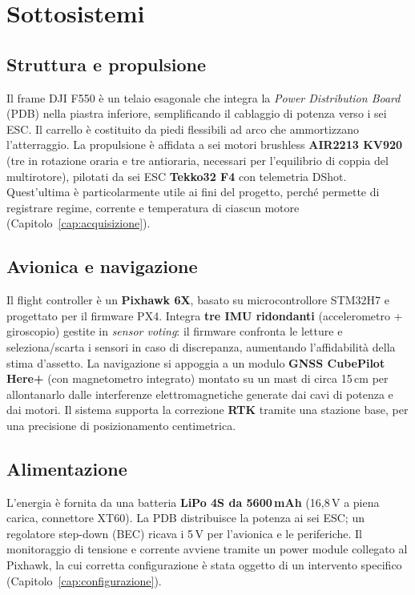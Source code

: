 \section{Sottosistemi}

\subsection{Struttura e propulsione}
Il frame DJI F550 \`e un telaio esagonale che integra la \emph{Power
Distribution Board} (PDB) nella piastra inferiore, semplificando il cablaggio
di potenza verso i sei ESC. Il carrello \`e costituito da piedi flessibili ad
arco che ammortizzano l'atterraggio. La propulsione \`e affidata a sei motori
brushless \textbf{AIR2213 KV920} (tre in rotazione oraria e tre antioraria,
necessari per l'equilibrio di coppia del multirotore), pilotati da sei ESC
\textbf{Tekko32 F4} con telemetria DShot. Quest'ultima \`e particolarmente
utile ai fini del progetto, perch\'e permette di registrare regime, corrente e
temperatura di ciascun motore (Capitolo~\ref{cap:acquisizione}).

\subsection{Avionica e navigazione}
Il flight controller \`e un \textbf{Pixhawk 6X}, basato su microcontrollore
STM32H7 e progettato per il firmware PX4. Integra \textbf{tre IMU ridondanti}
(accelerometro + giroscopio) gestite in \emph{sensor voting}: il firmware
confronta le letture e seleziona/scarta i sensori in caso di discrepanza,
aumentando l'affidabilit\`a della stima d'assetto. La navigazione si appoggia
a un modulo \textbf{GNSS CubePilot Here+} (con magnetometro integrato) montato
su un mast di circa 15\,cm per allontanarlo dalle interferenze
elettromagnetiche generate dai cavi di potenza e dai motori. Il sistema
supporta la correzione \textbf{RTK} tramite una stazione base, per una
precisione di posizionamento centimetrica.

\subsection{Alimentazione}
L'energia \`e fornita da una batteria \textbf{LiPo 4S da 5600\,mAh}
(16{,}8\,V a piena carica, connettore XT60). La PDB distribuisce la potenza ai
sei ESC; un regolatore step-down (BEC) ricava i 5\,V per l'avionica e le
periferiche. Il monitoraggio di tensione e corrente avviene tramite un power
module collegato al Pixhawk, la cui corretta configurazione \`e stata oggetto
di un intervento specifico (Capitolo~\ref{cap:configurazione}).

